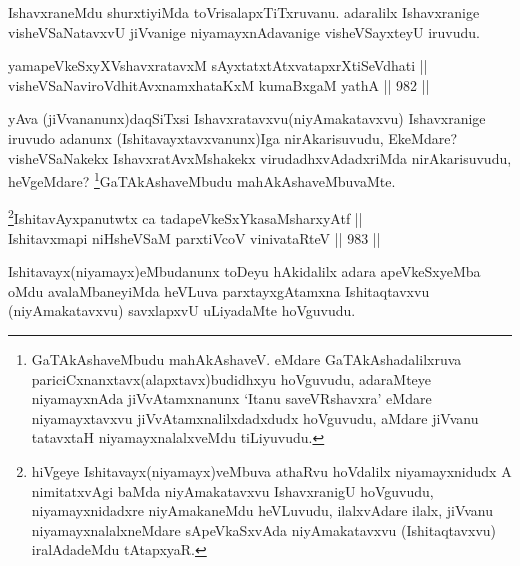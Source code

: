 \begin{artha}
IshavxraneMdu shurxtiyiMda toVrisalapxTiTxruvanu. adaralilx Ishavxranige visheVSaNatavxvU jiVvanige niyamayxnAdavanige visheVSayxteyU iruvudu.
\end{artha}


\begin{shl}
yamapeVkeSxyXVshavxratavxM sAyxtatxtAtxvatapxrXtiSeVdhati || \\
visheVSaNaviroVdhitAvxnamxhataKxM kumaBxgaM yathA \hfill || 982 ||  
\end{shl}

\begin{artha}
yAva (jiVvananunx)daqSiTxsi Ishavxratavxvu(niyAmakatavxvu) Ishavxranige iruvudo adanunx (Ishitavayxtavxvanunx)Iga nirAkarisuvudu, EkeMdare? visheVSaNakekx IshavxratAvxMshakekx virudadhxvAdadxriMda nirAkarisuvudu, heVgeMdare? \footnote{GaTAkAshaveMbudu mahAkAshaveV. eMdare GaTAkAshadalilxruva pariciCxnanxtavx(alapxtavx)budidhxyu hoVguvudu, adaraMteye niyamayxnAda jiVvAtamxnanunx `Itanu saveVRshavxra' eMdare niyamayxtavxvu jiVvAtamxnalilxdadxdudx hoVguvudu, aMdare jiVvanu tatavxtaH niyamayxnalalxveMdu tiLiyuvudu.}GaTAkAshaveMbudu mahAkAshaveMbuvaMte.
\end{artha}


\begin{shl}
\footnote{hiVgeye Ishitavayx(niyamayx)veMbuva athaRvu hoVdalilx niyamayxnidudx A nimitatxvAgi baMda niyAmakatavxvu IshavxranigU hoVguvudu, niyamayxnidadxre niyAmakaneMdu heVLuvudu, ilalxvAdare ilalx, jiVvanu niyamayxnalalxneMdare sApeVkaSxvAda niyAmakatavxvu (Ishitaqtavxvu) iralAdadeMdu tAtapxyaR.}IshitavAyxpanutwtx ca tadapeVkeSxYkasaMsharxyAtf || \\
Ishitavxmapi niHsheVSaM parxtiVcoV vinivataRteV \hfill || 983 ||  
\end{shl}

\begin{artha}
Ishitavayx(niyamayx)eMbudanunx toDeyu hAkidalilx adara apeVkeSxyeMba oMdu avalaMbaneyiMda heVLuva parxtayxgAtamxna Ishitaqtavxvu (niyAmakatavxvu) savxlapxvU uLiyadaMte hoVguvudu.
\end{artha}


